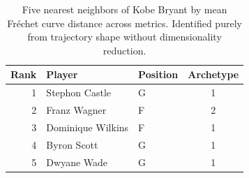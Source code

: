 \begin{table}[htbp]
  \centering\small
  \begin{tabular}{rllc}
    \toprule
    Rank & Player & Position & Archetype \\
    \midrule
    1 & Stephon Castle & G & 1 \\
    2 & Franz Wagner & F & 2 \\
    3 & Dominique Wilkins & F & 1 \\
    4 & Byron Scott & G & 1 \\
    5 & Dwyane Wade & G & 1 \\
    \bottomrule
  \end{tabular}
  \caption{Five nearest neighbors of Kobe Bryant by mean Fr\'{e}chet curve distance across metrics. Identified purely from trajectory shape without dimensionality reduction.}
  \label{tab:Kobe_Bryant_frechet_curve_neighbors}
\end{table}

